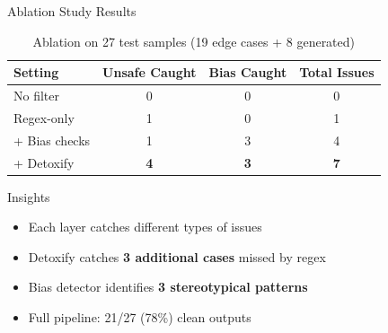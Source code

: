 \documentclass[aspectratio=169]{beamer}
\begin{document}
\begin{frame}{Ablation Study Results}
    \begin{table}
        \centering
        \begin{tabular}{lccc}
            \toprule
            \textbf{Setting} & \textbf{Unsafe Caught} & \textbf{Bias Caught} & \textbf{Total Issues} \\
            \midrule
            No filter & 0 & 0 & 0 \\
            Regex-only & 1 & 0 & 1 \\
            + Bias checks & 1 & 3 & 4 \\
            + Detoxify & \textbf{4} & \textbf{3} & \textbf{7} \\
            \bottomrule
        \end{tabular}
        \caption{Ablation on 27 test samples (19 edge cases + 8 generated)}
    \end{table}
    
    \vspace{0.3cm}
    
    \begin{block}{Insights}
        \begin{itemize}
            \item Each layer catches different types of issues
            \item Detoxify catches \textbf{3 additional cases} missed by regex
            \item Bias detector identifies \textbf{3 stereotypical patterns}
            \item Full pipeline: 21/27 (78\%) clean outputs
        \end{itemize}
    \end{block}
\end{frame}
\end{document}
